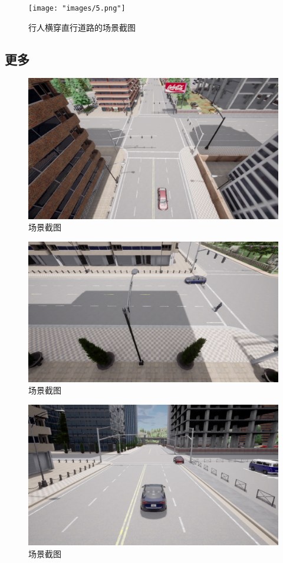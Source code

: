 \begin{figure}[H]
	\centering
	\texttt{[image: "images/5.png"]}
	\caption{行人横穿直行道路的场景截图}
	\label{fig:pedestrian_crossing}
\end{figure}
\subsection {更多}
\begin{figure}[H]
	\centering
	\includegraphics[width=1.0\textwidth]{"images/场景5.pdf"}
	\caption{场景截图}
	\label{}
\end{figure}
\begin{figure}[H]
	\centering
	\includegraphics[width=1.0\textwidth]{"images/场景6.pdf"}
	\caption{场景截图}
	\label{}
\end{figure}
\begin{figure}[H]
	\centering
	\includegraphics[width=1.0\textwidth]{"images/场景7.pdf"}
	\caption{场景截图}
	\label{}
\end{figure}
